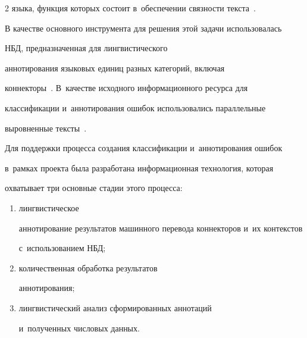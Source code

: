 \begin{multicols}{2}
языка, функция которых состоит в~обеспечении связности текста~\cite{4-gz}.


  


  В качестве основного инструмента для решения этой задачи использовалась 


НБД, предназначенная для лингвистического 


аннотирования языковых единиц разных категорий, включая  


коннекторы~\cite{5-gz, 6-gz, 7-gz, 8-gz}. В~качестве исходного информационного ресурса для 


классификации и~аннотирования ошибок использовались параллельные 


выровненные тексты~\cite{9-gz}.


  


  Для поддержки процесса создания классификации и~аннотирования ошибок 


  в~рамках проекта была разработана информационная технология, которая 


охватывает три основные стадии этого процесса: 


\begin{enumerate}[(1)]


\item лингвистическое 


аннотирование результатов машинного перевода коннекторов и~их контекстов 


с~использованием НБД;


\item количественная обработка результатов 


аннотирования;


\item лингвистический анализ сформированных аннотаций 


и~полученных числовых данных.


\end{enumerate}





\begin{table}\small %


\begin{center}




\vspace*{2ex}






\end{center}
\end{table}
\end{multicols}

